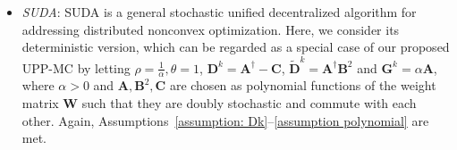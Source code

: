 \documentclass[12pt,draftcls,onecolumn]{IEEEtran}
\newcommand{\bG}{{\mathbf{G}}}
\newcommand{\bD}{{\mathbf{D}}}
\newcommand{\bW}{{\mathbf{W}}}
\begin{document}
\begin{itemize}
    \item[5)] \textit{SUDA}: SUDA \cite{alghunaim_unified_2022} is a general stochastic unified decentralized algorithm for addressing distributed nonconvex optimization. Here, we consider its deterministic version, which can be regarded as a special case of our proposed UPP-MC by letting $\rho=\frac{1}{\alpha},\theta=1$, $\bD^k=\mathbf{A}^\dagger-\mathbf{C}$, $\tilde{\bD}^k=\mathbf{A}^\dagger\mathbf{B}^2$ and $\bG^k=\alpha \mathbf{A}$, where $\alpha>0$ and $\mathbf{A},\mathbf{B}^2,\mathbf{C}$ are chosen as polynomial functions of the weight matrix $\bW$ such that they are doubly stochastic and commute with each other. Again, Assumptions~\ref{assumption: Dk}--\ref{assumption polynomial} are met.

\end{itemize}
\end{document}
